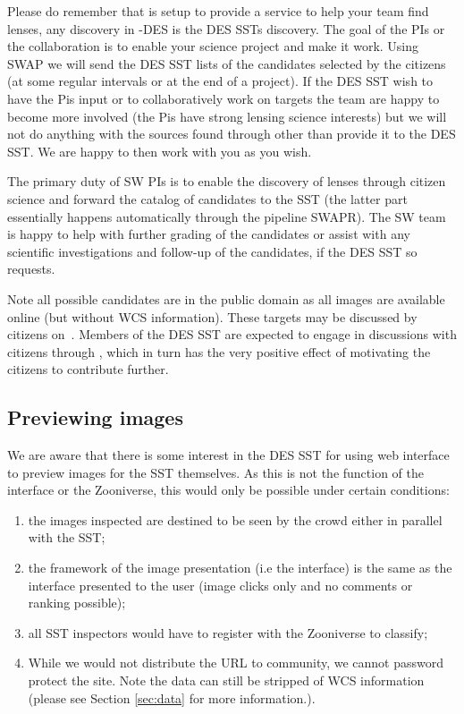 \documentclass[a4paper,twocolumn]{article}
\begin{document}
Please do remember that \SW is setup to provide a service to help your team find lenses, any discovery in \SW-DES is the DES SSTs discovery. The goal of the \SW PIs or the \SW collaboration is to enable your science project and make it work. Using SWAP we will send the DES SST lists of the candidates selected by the citizens (at some regular intervals or at the end of a project). If the DES SST wish to have the \SW Pis input or to collaboratively work on targets the \SW team are happy to become more involved (the \SW Pis have strong lensing science interests) but we will not do anything with the sources found through \SW other than provide it to the DES SST.  We are happy to then work with you as you wish. 

The primary duty of SW PIs is to enable the discovery of lenses through citizen science and forward the catalog of candidates to the SST (the latter part essentially happens automatically through the pipeline SWAPR). The SW team is happy to help with further grading of the candidates or assist with any scientific investigations and follow-up of the candidates, if the DES SST so requests. 


Note all possible candidates are in the public domain as all images are available online (but without WCS information). These targets may be discussed by citizens on \SW\,\Talk. Members of the DES SST are expected to engage in discussions with citizens through \Talk, which in turn has the very positive effect of motivating the citizens to contribute further.

\subsection{Previewing images}
We are aware that there is some interest in the DES SST for using \SW web interface to preview images for the SST themselves. As this is not the function of the \SW interface or the Zooniverse, this would only be possible under certain conditions:
\begin{enumerate}[label=(\alph*)]
\item the images inspected are destined to be seen by the crowd either in parallel with the SST;
\item the framework of the image presentation (i.e the \SW interface) is the same as the interface presented to the user (image clicks only and no comments or ranking possible);
\item all SST inspectors would have to register with the Zooniverse to classify;
\item While we would not distribute the URL to community, we cannot password protect the site. Note the data can still be stripped of WCS information (please see Section \ref{sec:data} for more information.).
\end{enumerate}
\end{document}
